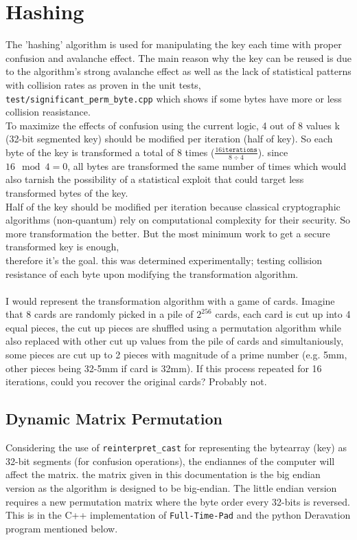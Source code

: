 \documentclass[fleqn, a4paper,12pt]{article}
\begin{document}
\section{Hashing}

The 'hashing' algorithm is used for manipulating the key each time with proper confusion and avalanche effect. The main reason why the key can be reused is due to the algorithm's strong avalanche effect as well as the lack of statistical patterns with collision rates as proven in the unit tests, \texttt{test/significant\_perm\_byte.cpp} which shows if some bytes have more or less collision reasistance.
\\
To maximize the effects of confusion using the current logic, 4 out of 8 values k (32-bit segmented key) should be modified per iteration (half of key). So each byte of the key is transformed a total of 8 times ($\frac{16 \texttt{iterations}}{8 \div 4}$). since $16 \mod 4 = 0$, all bytes are transformed the same number of times which would also tarnish the possibility of a statistical exploit that could target less transformed bytes of the key.
\\
Half of the key should be modified per iteration because classical cryptographic algorithms (non-quantum) rely on computational complexity for their security. So more transformation the better. But the most minimum work to get a secure transformed key is enough, \\
therefore it's the goal. this was determined experimentally; testing collision resistance of each byte upon modifying the transformation algorithm. \\
\\

I would represent the transformation algorithm with a game of cards. Imagine that 8 cards are randomly picked in a pile of $2^{256}$ cards, each card is cut up into 4 equal pieces, the cut up pieces are shuffled using a permutation algorithm while also replaced with other cut up values from the pile of cards and simultaniously, some pieces are cut up to 2 pieces with magnitude of a prime number (e.g. 5mm, other pieces being 32-5mm if card is 32mm). If this process repeated for 16 iterations, could you recover the original cards? Probably not.

\subsection{Dynamic Matrix Permutation}

Considering the use of \texttt{reinterpret\_cast} for representing the bytearray (key) as 32-bit segments (for confusion operations), the endiannes of the computer will affect the matrix. the matrix given in this documentation is the big endian version as the algorithm is designed to be big-endian. The little endian version requires a new permutation matrix where the byte order every 32-bits is reversed. This is in the C++ implementation of \texttt{Full-Time-Pad} and the python Deravation program mentioned below.
\end{document}
